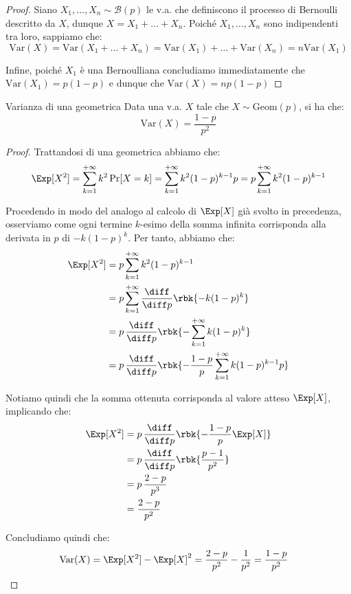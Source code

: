 \documentclass[a4paper, 12pt]{report}
\begin{document}
    \begin{proof}
        Siano $X_1, \ldots, X_n \sim \mathcal{B}(p)$ le v.a. che definiscono il processo di Bernoulli descritto da $X$, dunque $X = X_1 + \ldots + X_n$. Poiché $X_1, \ldots, X_n$ sono indipendenti tra loro, sappiamo che:
        \[\mathrm{Var}(X) = \mathrm{Var}(X_1 + \ldots + X_n) = \mathrm{Var}(X_1) + \ldots + \mathrm{Var}(X_n) = n \mathrm{Var}(X_1)\]

        Infine, poiché $X_1$ è una Bernoulliana concludiamo immediatamente che $\mathrm{Var}(X_1) = p(1-p)$ e dunque che $\mathrm{Var}(X) = np(1-p)$
    \end{proof}

    \begin{framedprop}{Varianza di una geometrica}
        Data una v.a. $X$ tale che $X \sim \mathrm{Geom}(p)$, si ha che:
        \[\mathrm{Var}(X) = \frac{1-p}{p^2}\]
    \end{framedprop}

    \begin{proof}
        Trattandosi di una geometrica abbiamo che:
        \[\begin{split}
            \Exp[X^2] &= \sum_{k = 1}^{+\infty} k^2 \Pr[X = k] = \sum_{k = 1}^{+\infty} k^2 (1-p)^{k-1} p = p \sum_{k = 1}^{+\infty} k^2 (1-p)^{k-1}\\
        \end{split}\]

        Procedendo in modo del analogo al calcolo di $\Exp[X]$ già svolto in precedenza, osserviamo come ogni termine $k$-esimo della somma infinita corrisponda alla derivata in $p$ di $-k(1-p)^k$. Per tanto, abbiamo che:
        \[\begin{split}
            \Exp[X^2] &= p\sum_{k = 1}^{+\infty} k^2 (1-p)^{k-1} \\
            &= p \sum_{k = 1}^{+\infty} \frac{\diff}{\diff p} \rbk{-k (1-p)^{k}} \\
            &= p \, \frac{\diff}{\diff p} \rbk{- \sum_{k = 1}^{+\infty} k (1-p)^{k}}  \\
            &= p \, \frac{\diff}{\diff p} \rbk{- \frac{1-p}{p} \sum_{k = 1}^{+\infty} k (1-p)^{k-1}p}  \\
        \end{split}\]

        Notiamo quindi che la somma ottenuta corrisponda al valore atteso $\Exp[X]$, implicando che:
        \[\begin{split}
        \Exp[X^2] &= p \, \frac{\diff}{\diff p} \rbk{- \frac{1-p}{p} \Exp[X]} \\
        &= p \, \frac{\diff}{\diff p} \rbk{ \frac{p-1}{p^2}} \\
        &= p \, \frac{2-p}{p^3} \\
        &= \frac{2-p}{p^2} \\
        \end{split}\]

        Concludiamo quindi che:
        \[\begin{split}
            \mathrm{Var}(X) &= \Exp[X^2] - \Exp[X]^2 = \frac{2-p}{p^2} - \frac{1}{p^2} = \frac{1-p}{p^2}
        \end{split}\]
    \end{proof}
\end{document}
